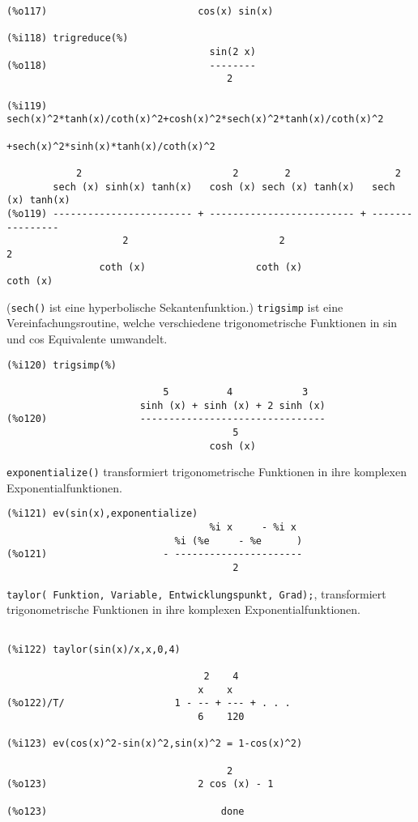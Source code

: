 \documentclass[ngerman,12pt,a4paper]{article}
\begin{document}
\scriptsize
\begin{verbatim}
(%o117)                          cos(x) sin(x)

(%i118) trigreduce(%)
                                   sin(2 x)
(%o118)                            --------
                                      2

(%i119) sech(x)^2*tanh(x)/coth(x)^2+cosh(x)^2*sech(x)^2*tanh(x)/coth(x)^2
                                   +sech(x)^2*sinh(x)*tanh(x)/coth(x)^2

            2                          2        2                  2
        sech (x) sinh(x) tanh(x)   cosh (x) sech (x) tanh(x)   sech (x) tanh(x)
(%o119) ------------------------ + ------------------------- + ----------------
                    2                          2                       2
                coth (x)                   coth (x)                coth (x)
\end{verbatim}
\normalsize

(\verb|sech()| ist eine hyperbolische Sekantenfunktion.) \verb|trigsimp| ist eine Vereinfachungsroutine, welche verschiedene trigonometrische Funktionen in sin und cos Equivalente umwandelt.

\scriptsize
\begin{verbatim}
(%i120) trigsimp(%)

                           5          4            3
                       sinh (x) + sinh (x) + 2 sinh (x)
(%o120)                --------------------------------
                                       5
                                   cosh (x)
\end{verbatim}
\normalsize

\verb|exponentialize()| transformiert trigonometrische Funktionen in ihre komplexen Exponentialfunktionen.

\scriptsize
\begin{verbatim}
(%i121) ev(sin(x),exponentialize)
                                   %i x     - %i x
                             %i (%e     - %e      )
(%o121)                    - ----------------------
                                       2
\end{verbatim}
\normalsize


\verb|taylor( Funktion, Variable, Entwicklungspunkt, Grad);|, transformiert trigonometrische Funktionen in ihre komplexen Exponentialfunktionen.

\scriptsize
\begin{verbatim}

(%i122) taylor(sin(x)/x,x,0,4)

                                  2    4
                                 x    x
(%o122)/T/                   1 - -- + --- + . . .
                                 6    120

(%i123) ev(cos(x)^2-sin(x)^2,sin(x)^2 = 1-cos(x)^2)

                                      2
(%o123)                          2 cos (x) - 1

(%o123)                              done
\end{verbatim}
\normalsize
\end{document}
